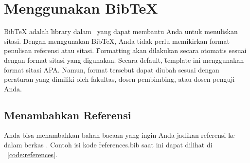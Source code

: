 \section{Menggunakan BibTeX}
\label{sec:bibtex}
BibTeX adalah \f{library} dalam \latex~yang dapat membantu Anda untuk menuliskan sitasi.
Dengan menggunakan BibTeX, Anda tidak perlu memikirkan format penulisan referensi atau sitasi.
\f{Formatting} akan dilakukan secara otomatis sesuai dengan format sitasi yang digunakan.
Secara \f{default}, \f{template} ini menggunakan format sitasi APA.
Namun, format tersebut dapat diubah sesuai dengan peraturan yang dimiliki oleh fakultas, dosen pembimbing, atau dosen penguji Anda.

\subsection{Menambahkan Referensi}
\label{sec:bibtexAddRef}
Anda bisa menambahkan bahan bacaan yang ingin Anda jadikan referensi ke dalam berkas .
Contoh isi kode \f{references.bib} saat ini dapat dilihat di \lst~\ref{code:references}.


